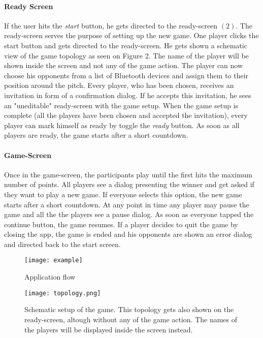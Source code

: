 \documentclass{report}
\newcommand{\lfig}[1]{\label{fig:#1}}
\begin{document}
\paragraph{Ready Screen}
If the user hits the \textit{start} button, he gets directed to the ready-screen $(2)$. The ready-screen serves the purpose of setting up the new game. One player clicks the start button and gets directed to the ready-screen. He gets shown a schematic view of the game topology as seen on Figure 2. The name of the player will be shown inside the screen and not any of the game action. The player can now choose his opponents from a list of Bluetooth devices and assign them to their position around the pitch. Every player, who has been chosen, receives an invitation in form of a confirmation dialog. If he accepts this invitation, he sees an "uneditable" ready-screen with the game setup. When the game setup is complete (all the players have been chosen and accepted the invitation), every player can mark himself as ready by toggle the \textit{ready} button. As soon as all players are ready, the game starts after a short countdown.

\paragraph{Game-Screen}
Once in the game-screen, the participants play until the first hits the maximum number of points. All players see a dialog presenting the winner and get asked if they want to play a new game. If everyone selects this option, the new game starts after a short countdown. At any point in time any player may pause the game and all the the players see a pause dialog. As soon as everyone tapped the continue button, the game resumes. If a player decides to quit the game by closing the app, the game is ended and his opponents are shown an error dialog and directed back to the start screen.

\begin{figure}[h]
	\centering
    \texttt{[image: example]}
    \lfig{example}
    \vspace{-5mm} %
	\caption{Application flow}
\end{figure}

\begin{figure}[h]
	\centering
    \texttt{[image: topology.png]}
    \lfig{system-overview}
    \vspace{-5mm} %
	\caption{Schematic setup of the game. This topology gets also shown on the ready-screen, altough without any of the game action. The names of the players will be displayed inside the screen instead.}
\end{figure}
\end{document}
